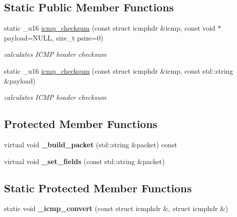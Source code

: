 \subsection*{Static Public Member Functions}
\begin{CompactItemize}
\item 
static \_\-u16 \hyperlink{classsocketpp_1_1ICMP__RawSocket_6c8a1364919485932221942c472ea95e}{icmp\_\-checksum} (const struct icmphdr \&icmp, const void $\ast$payload=NULL, size\_\-t psize=0)
\begin{CompactList}\small\item\em calculates ICMP header checksum \item\end{CompactList}\item 
static \_\-u16 \hyperlink{classsocketpp_1_1ICMP__RawSocket_eb8e83796aefe5a5dd7035490902a537}{icmp\_\-checksum} (const struct icmphdr \&icmp, const std::string \&payload)
\begin{CompactList}\small\item\em calculates ICMP header checksum \item\end{CompactList}\end{CompactItemize}
\subsection*{Protected Member Functions}
\begin{CompactItemize}
\item 
\hypertarget{classsocketpp_1_1ICMP__RawSocket_1dcbe47b02ddfff9545cedca9d78e36c}{
virtual void \textbf{\_\-build\_\-packet} (std::string \&packet) const }
\label{classsocketpp_1_1ICMP__RawSocket_1dcbe47b02ddfff9545cedca9d78e36c}

\item 
\hypertarget{classsocketpp_1_1ICMP__RawSocket_e183b11c080f5d74dbc386ec53e7feb5}{
virtual void \textbf{\_\-set\_\-fields} (const std::string \&packet)}
\label{classsocketpp_1_1ICMP__RawSocket_e183b11c080f5d74dbc386ec53e7feb5}

\end{CompactItemize}
\subsection*{Static Protected Member Functions}
\begin{CompactItemize}
\item 
\hypertarget{classsocketpp_1_1ICMP__RawSocket_9ecff00c5732fced1d5dda68a5709651}{
static void \textbf{\_\-icmp\_\-convert} (const struct icmphdr \&, struct icmphdr \&)}
\label{classsocketpp_1_1ICMP__RawSocket_9ecff00c5732fced1d5dda68a5709651}

\end{CompactItemize}
